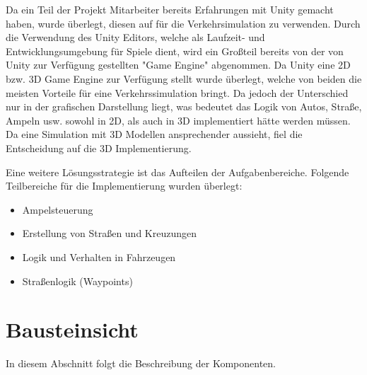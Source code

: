 Da ein Teil der Projekt Mitarbeiter bereits Erfahrungen mit Unity gemacht haben, wurde überlegt, diesen auf für die Verkehrsimulation zu verwenden. Durch die Verwendung des Unity Editors, welche als Laufzeit- und Entwicklungsumgebung für Spiele dient, wird ein Großteil bereits von der von Unity zur Verfügung gestellten "Game Engine" abgenommen. 
Da Unity eine 2D bzw. 3D Game Engine zur Verfügung stellt wurde überlegt, welche von beiden die meisten Vorteile für eine Verkehrssimulation bringt. Da jedoch der Unterschied nur in der grafischen Darstellung liegt, was bedeutet das Logik von Autos, Straße, Ampeln usw. sowohl in 2D, als auch in 3D implementiert hätte werden müssen. Da eine Simulation mit 3D Modellen ansprechender aussieht, fiel die Entscheidung auf die 3D Implementierung.

Eine weitere Lösungsstrategie ist das Aufteilen der Aufgabenbereiche. Folgende Teilbereiche für die Implementierung wurden überlegt:

\begin{itemize}  
\item Ampelsteuerung
\item Erstellung von Straßen und Kreuzungen
\item Logik und Verhalten in Fahrzeugen
\item Straßenlogik (Waypoints)
\end{itemize}

\section{Bausteinsicht}
\label{Bausteinsicht}

In diesem Abschnitt folgt die Beschreibung der Komponenten.

